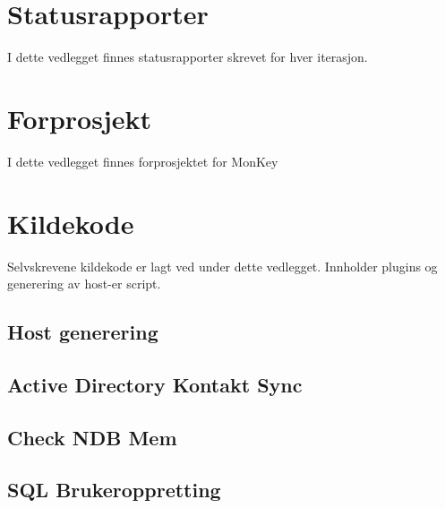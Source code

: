 \documentclass[a4paper,twoside,11pt,pdftex,norsk]{report}
\newcounter{includepdfpage}
\newcounter{currentpagecounter}
\newcommand{\addlabelstoallincludedpages}[1]{
   \refstepcounter{includepdfpage}
   \stepcounter{currentpagecounter}
	\appendix
   \label{#1.\thecurrentpagecounter}}
\newcommand{\modifiedincludepdf}[3]{
    \setcounter{currentpagecounter}{0}
    }
\newenvironment{changemargin}[2]{%
\begin{list}{}{%
\linespread{0.9}%
\setlength{\topsep}{0pt}%
\setlength{\leftmargin}{#1}%
\setlength{\rightmargin}{#2}%
\setlength{\listparindent}{\parindent}%
\setlength{\itemindent}{\parindent}%
\setlength{\parsep}{\parskip}%
}%
\item[]}{\end{list}}
\begin{document}
\begin{appendices}
\chapter{Statusrapporter}\label{app:statusrapporter}
I dette vedlegget finnes statusrapporter skrevet for hver iterasjon.








\chapter{Forprosjekt}\label{app:forprosjekt}
I dette vedlegget finnes forprosjektet for MonKey


\chapter{Kildekode}\label{app:kildekode}
Selvskrevene kildekode er lagt ved under dette vedlegget. Innholder plugins og generering av host-er script.

\begin{changemargin}{-1cm}{-1cm}
\section{Host generering}


\section{Active Directory Kontakt Sync}


\section{Check NDB Mem}

\clearpage
\section{SQL Brukeroppretting}




\end{changemargin}
\end{appendices}
\end{document}
